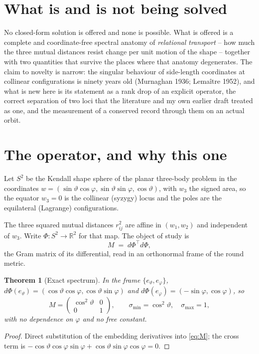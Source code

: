 \documentclass[11pt]{article}
\newtheorem{theorem}{Theorem}
\theoremstyle{remark}
\begin{document}
\section{What is and is not being solved}

No closed-form solution is offered and none is possible. What is offered is a complete and
coordinate-free spectral anatomy of \emph{relational transport} -- how much the three mutual
distances resist change per unit motion of the shape -- together with two quantities that
survive the places where that anatomy degenerates. The claim to novelty is narrow: the
singular behaviour of side-length coordinates at collinear configurations is ninety years
old (Murnaghan 1936; Lema\^itre 1952), and what is new here is its statement as a rank drop
of an explicit operator, the correct separation of two loci that the literature and my own
earlier draft treated as one, and the measurement of a conserved record through them on an
actual orbit.

\section{The operator, and why this one}

Let $S^2$ be the Kendall shape sphere of the planar three-body problem in the coordinates
$w=(\sin\vartheta\cos\varphi,\sin\vartheta\sin\varphi,\cos\vartheta)$, with $w_3$ the signed
area, so the equator $w_3=0$ is the collinear (syzygy) locus and the poles are the
equilateral (Lagrange) configurations.

The three squared mutual distances $r_{ij}^2$ are affine in $(w_1,w_2)$ and independent of
$w_3$. Write $\Phi:S^2\to\mathbb R^2$ for that map. The object of study is
\begin{equation}
M \;=\; d\Phi^{\!\top}d\Phi ,
\label{eq:M}
\end{equation}
the Gram matrix of its differential, read in an orthonormal frame of the round metric.

\begin{theorem}[Exact spectrum]\label{t:spec}
In the frame $\{e_\vartheta,e_\varphi\}$,
$d\Phi(e_\vartheta)=(\cos\vartheta\cos\varphi,\cos\vartheta\sin\varphi)$ and
$d\Phi(e_\varphi)=(-\sin\varphi,\cos\varphi)$, so
\[
M=\begin{pmatrix}\cos^{2}\vartheta&0\\[2pt]0&1\end{pmatrix},
\qquad
\sigma_{\min}=\cos^{2}\vartheta,\quad\sigma_{\max}=1 ,
\]
with no dependence on $\varphi$ and no free constant.
\end{theorem}
\begin{proof}
Direct substitution of the embedding derivatives into \eqref{eq:M}; the cross term is
$-\cos\vartheta\cos\varphi\sin\varphi+\cos\vartheta\sin\varphi\cos\varphi=0$.
\end{proof}
\end{document}

